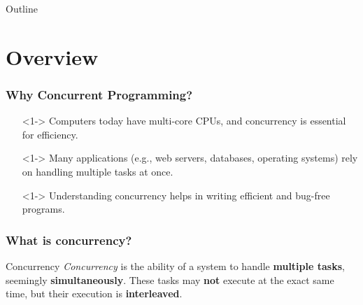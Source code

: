 \documentclass[xcolor={dvipsnames,svgnames},aspectratio=169]{beamer}
\begin{document}
\begin{frame}{Outline}
  \tableofcontents
\end{frame}

\section{Overview}

\begin{frame}[fragile]
  \frametitle{Why Concurrent Programming?}

  \begin{itemize}
  \item[\faBook]<1-> Computers today have multi-core CPUs, and concurrency is essential for efficiency.
  \item[\faBook]<1-> Many applications (e.g., web servers, databases, operating systems) rely on handling multiple tasks at once.
  \item[\faBook]<1-> Understanding concurrency helps in writing efficient and
    bug-free programs.
  \end{itemize}
  \vspace{0.6cm}
\end{frame}

\begin{frame}[fragile]
  \frametitle{What is concurrency?}

  \begin{block}{Concurrency}
    \emph{Concurrency} is the ability of a system to handle \textbf{multiple
      tasks}, seemingly \textbf{simultaneously}. These tasks may \textbf{not} execute at the
    exact same time, but their execution is \textbf{interleaved}.
  \end{block}

\end{frame}
\end{document}
